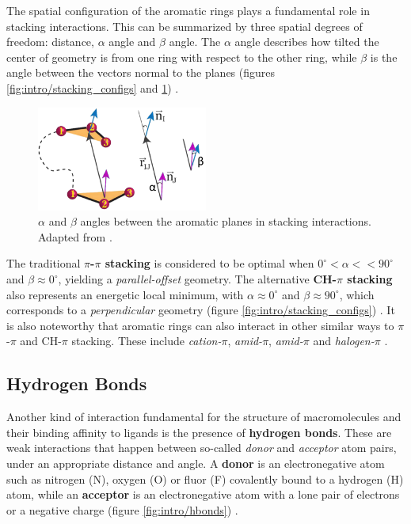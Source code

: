    The spatial configuration of the aromatic rings plays a fundamental role in stacking interactions. This can be summarized by three spatial degrees of freedom: distance, $\alpha$ angle and $\beta$ angle. The $\alpha$ angle describes how tilted the center of geometry is from one ring with respect to the other ring, while $\beta$ is the angle between the vectors normal to the planes (figures \ref{fig:intro/stacking_configs} and \ref{fig:intro/stacking_angles}) \cite{stacking_general_2020, rna_2015, aromatic_2018}.

    \begin{figure}[H]
      \centering
      \includegraphics[width=0.5\textwidth]{figures/intro/stacking_angles.png}
      \caption{\label{fig:intro/stacking_angles} $\alpha$ and $\beta$ angles between the aromatic planes in stacking interactions. Adapted from \cite{rna_2015}.}
    \end{figure}

    The traditional \textbf{$\pi$-$\pi$ stacking} is considered to be optimal when $0^{\circ} < \alpha << 90^{\circ}$ and $\beta \approx 0^{\circ}$, yielding a \textit{parallel-offset} geometry. The alternative \textbf{CH-$\pi$ stacking} also represents an energetic local minimum, with $\alpha \approx 0^{\circ}$ and $\beta \approx 90^{\circ}$, which corresponds to a \textit{perpendicular} geometry (figure \ref{fig:intro/stacking_configs}) \cite{stacking_general_2020}. It is also noteworthy that aromatic rings can also interact in other similar ways to $\pi$-$\pi$ and CH-$\pi$ stacking. These include \textit{cation-$\pi$}, \textit{amid-$\pi$}, \textit{amid-$\pi$} and \textit{halogen-$\pi$} \cite{stacking_binding_2020, electrostatics_2020}.

  \subsection{Hydrogen Bonds}
    Another kind of interaction fundamental for the structure of macromolecules and their binding affinity to ligands is the presence of \textbf{hydrogen bonds}. These are weak interactions that happen between so-called \textit{donor} and \textit{acceptor} atom pairs, under an appropriate distance and angle. A \textbf{donor} is an electronegative atom such as nitrogen (N), oxygen (O) or fluor (F) covalently bound to a hydrogen (H) atom, while an \textbf{acceptor} is an electronegative atom with a lone pair of electrons or a negative charge (figure \ref{fig:intro/hbonds}) \cite{hbonds_2023}.

